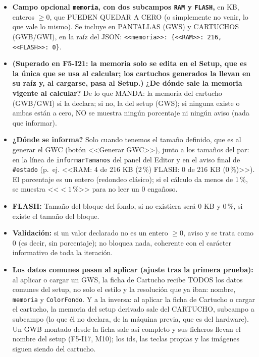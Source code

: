 \begin{itemize}
	\item \textbf{Campo opcional \texttt{memoria}, con dos subcampos \texttt{RAM} y \texttt{FLASH},} en KB, enteros $\ge 0$, que PUEDEN QUEDAR A CERO (o simplemente no venir, lo que vale lo mismo). Se incluye en PANTALLAS (GWS) y CARTUCHOS (GWB/GWI), en la raíz del JSON: 
	\texttt{<<memoria>>: \{<<RAM>>: 216, <<FLASH>>: 0\}}.
	
	\item \textbf{(Superado en F5-I21: la memoria solo se edita en el Setup, que es la única que se usa al calcular; los cartuchos generados la llevan en su raíz y, al cargarse, pasa al Setup.)} \textbf{¿De dónde sale la memoria vigente al calcular?} De lo que
	MANDA: la memoria del cartucho (GWB/GWI) si la declara; si no, la del
	setup (GWS); si ninguna existe o ambas están a cero, NO se muestra
	ningún porcentaje ni ningún aviso (nada que informar).
	
	\item \textbf{¿Dónde se informa?} Solo cuando tenemos el tamaño definido, que es al generar el GWC (botón <<Generar GWC>>), junto a los
	tamaños del par: en la línea de \texttt{informarTamanos} del panel del
	Editor y en el aviso final de \texttt{\#estado} (p.~ej.
	<<RAM: 4 de 216 KB (2\,\%) \textperiodcentered{} FLASH: 0 de 216 KB
	(0\,\%)>>). El porcentaje es un entero (redondeo clásico);
	si el cálculo da menos de 1\,\%, se muestra <<$< 1$\,\%>> para no leer un 0 engañoso.
	
	\item \textbf{FLASH:} Tamaño del bloque del fondo, si no existiera será 0 KB y 0\,\%, si existe el tamaño del bloque. 
	\item \textbf{Validación:} si un valor declarado no
	es un entero $\ge 0$, aviso y se trata como 0 (es decir, sin
	porcentaje); no bloquea nada, coherente con el carácter informativo de
	toda la iteración.
	
	\item \textbf{Los datos comunes pasan al aplicar (ajuste tras la
		primera prueba):} al aplicar o cargar un GWS, la ficha de Cartucho
	recibe TODOS los datos comunes del setup, no solo el estilo y la
	resolución que ya iban: nombre, \texttt{memoria} y \texttt{ColorFondo}.
	Y a la inversa: al aplicar la ficha de Cartucho o cargar el cartucho,
	la memoria del setup derivado sale del CARTUCHO, subcampo a subcampo
	(lo que él no declara, de la máquina previa, que es del hardware). Un
	GWB montado desde la ficha sale así completo y sus ficheros llevan el
	nombre del setup (F5-I17, M10); los ids, las teclas propias y las
	imágenes siguen siendo del cartucho.
	

\end{itemize}
